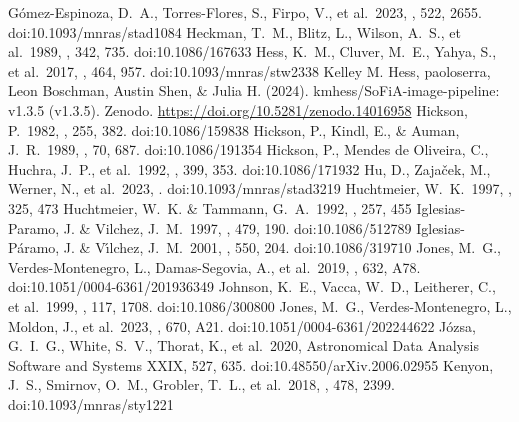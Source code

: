 \documentclass{aa}
\begin{document}
\begin{thebibliography}{}
      G{\'o}mez-Espinoza, D.~A., Torres-Flores, S., Firpo, V., et al.\ 2023, \mnras, 522, 2655. doi:10.1093/mnras/stad1084
      Heckman, T.~M., Blitz, L., Wilson, A.~S., et al.\ 1989, \apj, 342, 735. doi:10.1086/167633
      Hess, K.~M., Cluver, M.~E., Yahya, S., et al.\ 2017, \mnras, 464, 957. doi:10.1093/mnras/stw2338
      Kelley M. Hess, paoloserra, Leon Boschman, Austin Shen, \& Julia H. (2024). kmhess/SoFiA-image-pipeline: v1.3.5 (v1.3.5). Zenodo. \url{https://doi.org/10.5281/zenodo.14016958}
      Hickson, P.\ 1982, \apj, 255, 382. doi:10.1086/159838
      Hickson, P., Kindl, E., \& Auman, J.~R.\ 1989, \apjs, 70, 687. doi:10.1086/191354
      Hickson, P., Mendes de Oliveira, C., Huchra, J.~P., et al.\ 1992, \apj, 399, 353. doi:10.1086/171932
      Hu, D., Zaja{\v{c}}ek, M., Werner, N., et al.\ 2023, \mnras. doi:10.1093/mnras/stad3219
      Huchtmeier, W.~K.\ 1997, \aap, 325, 473
      Huchtmeier, W.~K. \& Tammann, G.~A.\ 1992, \aap, 257, 455
      Iglesias-Paramo, J. \& Vilchez, J.~M.\ 1997, \apj, 479, 190. doi:10.1086/512789
     Iglesias-P{\'a}ramo, J. \& V{\'\i}lchez, J.~M.\ 2001, \apj, 550, 204. doi:10.1086/319710
      Jones, M.~G., Verdes-Montenegro, L., Damas-Segovia, A., et al.\ 2019, \aap, 632, A78. doi:10.1051/0004-6361/201936349 
      Johnson, K.~E., Vacca, W.~D., Leitherer, C., et al.\ 1999, \aj, 117, 1708. doi:10.1086/300800
      Jones, M.~G., Verdes-Montenegro, L., Moldon, J., et al.\ 2023, \aap, 670, A21. doi:10.1051/0004-6361/202244622
      J{\'o}zsa, G.~I.~G., White, S.~V., Thorat, K., et al.\ 2020, Astronomical Data Analysis Software and Systems XXIX, 527, 635. doi:10.48550/arXiv.2006.02955
      Kenyon, J.~S., Smirnov, O.~M., Grobler, T.~L., et al.\ 2018, \mnras, 478, 2399. doi:10.1093/mnras/sty1221

\end{thebibliography}
\end{document}

